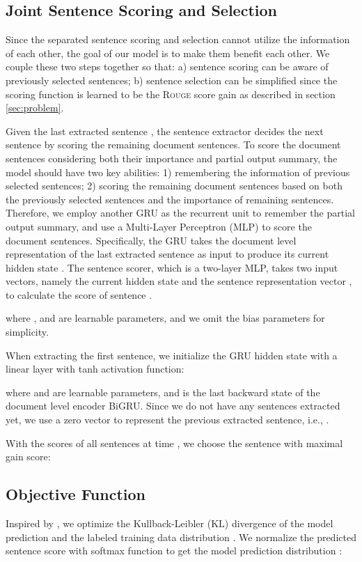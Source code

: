\documentclass[11pt,a4paper]{article}
\begin{document}
\subsection{Joint Sentence Scoring and Selection}
Since the separated sentence scoring and selection cannot utilize the information of each other, the goal of our model is to make them benefit each other.
We couple these two steps together so that: a) sentence scoring can be aware of previously selected sentences; b) sentence selection can be simplified since the scoring function is learned to be the \textsc{Rouge} score gain as described in section \ref{sec:problem}.


Given the last extracted sentence , the sentence extractor decides the next sentence   by scoring the remaining document sentences.
To score the document sentences considering both their importance and partial output summary, the model should have two key abilities: 1) remembering the information of previous selected sentences; 2) scoring the remaining document sentences based on both the previously selected sentences and the importance of remaining sentences.
Therefore, we employ another GRU as the recurrent unit to remember the partial output summary, and use a Multi-Layer Perceptron (MLP) to score the document sentences.
Specifically, the GRU takes the document level representation  of the last  extracted sentence  as input to produce its current hidden state .
The sentence scorer, which is a two-layer MLP, takes two input vectors, namely the current hidden state  and the sentence representation vector , to calculate the score  of sentence .

where ,  and  are learnable parameters, and we omit the bias parameters for simplicity.

When extracting the first sentence, we initialize the GRU hidden state  with a linear layer with tanh activation function:

where and  are learnable parameters, and  is the last backward state of the document level encoder BiGRU.
Since we do not have any sentences extracted yet, we use a zero vector to represent the previous extracted sentence, i.e., .


With the scores of all sentences at time , we choose the sentence with maximal gain score:




\subsection{Objective Function}
Inspired by \citet{inan2016tying}, we optimize the Kullback-Leibler (KL) divergence of the model prediction  and the labeled training data distribution .
We normalize the predicted sentence score  with softmax function to get the model prediction distribution :
\end{document}
